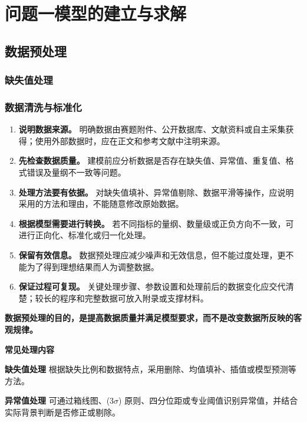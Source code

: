 \section{问题一模型的建立与求解}

\subsection{数据预处理}
\subsubsection{缺失值处理}
\subsubsection{数据清洗与标准化}
\begin{enumerate}[label=(\arabic*), leftmargin=2.5em, itemsep=0.3em]
\item \textbf{说明数据来源。} 明确数据由赛题附件、公开数据库、文献资料或自主采集获得；使用外部数据时，应在正文和参考文献中注明来源。

\item \textbf{先检查数据质量。} 建模前应分析数据是否存在缺失值、异常值、重复值、格式错误及量纲不一致等问题。

\item \textbf{处理方法要有依据。} 对缺失值填补、异常值剔除、数据平滑等操作，应说明采用的方法和理由，不能随意修改原始数据。

\item \textbf{根据模型需要进行转换。} 若不同指标的量纲、数量级或正负方向不一致，可进行正向化、标准化或归一化处理。

\item \textbf{保留有效信息。} 数据预处理应减少噪声和无效信息，但不能过度处理，更不能为了得到理想结果而人为调整数据。

\item \textbf{保证过程可复现。} 关键处理步骤、参数设置和处理前后的数据变化应交代清楚；较长的程序和完整数据可放入附录或支撑材料。
\end{enumerate}

\textbf{数据预处理的目的，是提高数据质量并满足模型要求，而不是改变数据所反映的客观规律。}

\textbf{常见处理内容}

 \textbf{缺失值处理} 根据缺失比例和数据特点，采用删除、均值填补、插值或模型预测等方法。

 \textbf{异常值处理} 可通过箱线图、(3$\sigma$) 原则、四分位距或专业阈值识别异常值，并结合实际背景判断是否修正或剔除。

